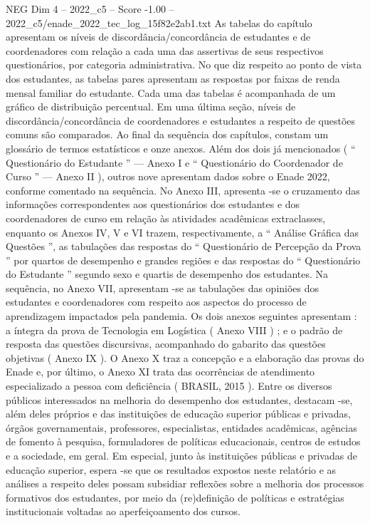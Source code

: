 \begin{textsample}{NEG Dim 4 – 2022\_c5 – Score -1.00 – 2022\_c5/enade\_2022\_tec\_log\_15f82e2ab1.txt}
As tabelas do capítulo apresentam os níveis de discordância/concordância de estudantes e de coordenadores com relação a cada uma das assertivas de seus respectivos questionários, por categoria administrativa.
No que diz respeito ao ponto de vista dos estudantes, as tabelas pares apresentam as respostas por faixas de renda mensal familiar do estudante.
Cada uma das tabelas é acompanhada de um gráfico de distribuição percentual.
Em uma última seção, níveis de discordância/concordância de coordenadores e estudantes a respeito de questões comuns são comparados.
Ao final da sequência dos capítulos, constam um glossário de termos estatísticos e onze anexos.
Além dos dois já mencionados ( “ Questionário do Estudante ” — Anexo I e “ Questionário do Coordenador de Curso ” — Anexo II ), outros nove apresentam dados sobre o Enade 2022, conforme comentado na sequência.
No Anexo III, apresenta -se o cruzamento das informações correspondentes aos questionários dos estudantes e dos coordenadores de curso em relação às atividades acadêmicas extraclasses, enquanto os Anexos IV, V e VI trazem, respectivamente, a “ Análise Gráfica das Questões ”, as tabulações das respostas do “ Questionário de Percepção da Prova ” por quartos de desempenho e grandes regiões e das respostas do “ Questionário do Estudante ” segundo sexo e quartis de desempenho dos estudantes.
Na sequência, no Anexo VII, apresentam -se as tabulações das opiniões dos estudantes e coordenadores com respeito aos aspectos do processo de aprendizagem impactados pela pandemia.
Os dois anexos seguintes apresentam : a íntegra da prova de Tecnologia em Logística ( Anexo VIII ) ; e o padrão de resposta das questões discursivas, acompanhado do gabarito das questões objetivas ( Anexo IX ).
O Anexo X traz a concepção e a elaboração das provas do Enade e, por último, o Anexo XI trata das ocorrências de atendimento especializado a pessoa com deficiência ( BRASIL, 2015 ).
Entre os diversos públicos interessados na melhoria do desempenho dos estudantes, destacam -se, além deles próprios e das instituições de educação superior públicas e privadas, órgãos governamentais, professores, especialistas, entidades acadêmicas, agências de fomento à pesquisa, formuladores de políticas educacionais, centros de estudos e a sociedade, em geral.
Em especial, junto às instituições públicas e privadas de educação superior, espera -se que os resultados expostos neste relatório e as análises a respeito deles possam subsidiar reflexões sobre a melhoria dos processos formativos dos estudantes, por meio da (re)definição de políticas e estratégias institucionais voltadas ao aperfeiçoamento dos cursos.

\end{textsample}
